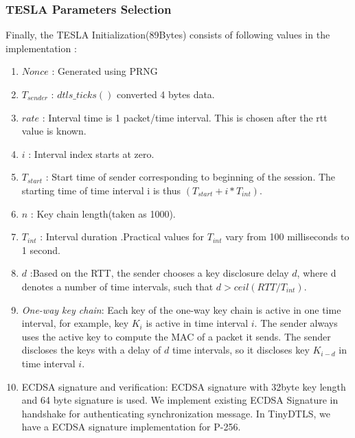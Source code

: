     
    
\subsubsection{TESLA Parameters Selection}
Finally, the TESLA Initialization(89Bytes) consists of following values in the implementation :
\begin{enumerate}
    \item $Nonce$ : Generated using PRNG
    \item $T_{sender}$ : $dtls\_ticks()$ converted 4 bytes data. 
    \item $rate$ : Interval time is 1 packet/time interval. This is chosen after the rtt value is known.
    \item $i$ : Interval index starts at zero. 
    \item $T_{start}$ : Start time of sender corresponding to beginning of the session.
    The starting time of time interval i is thus $(T_{start} + i * T_{int})$.
    
    \item $n$ : Key chain length(taken as 1000). 
    
    \item $T_{int}$ : Interval duration .Practical values for $T_{int}$ vary from 100 milliseconds to 1 second.
    
    \item $d$ :Based on the RTT, the sender chooses a key disclosure delay $d$, where d denotes a number
   of time intervals, such that $d > ceil(RTT/T_{int})$.
   
   \item \textit{One-way key chain}: Each key of the one-way key chain is active in one time interval, for example, key $K_{i}$ is active in time interval $i$. The sender always uses the active key to compute the MAC of a packet it sends. The sender discloses the keys with a delay of $d$ time intervals, so it discloses key $K_{i-d}$ in
   time interval $i$.
   
    \item ECDSA signature and verification: ECDSA signature with 32byte key length and 64 byte signature is used. We implement existing ECDSA Signature in handshake for authenticating synchronization message. In TinyDTLS, we have a ECDSA signature implementation for P-256.
    
    
    
    
\end{enumerate}





